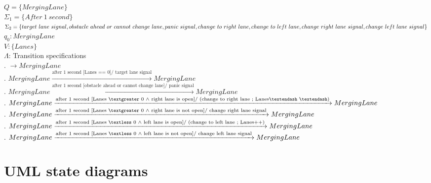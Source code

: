 \documentclass[12pt]{article}
\begin{document}
\begin{spacing}{1.5}
\noindent $Q = \{Merging Lane\}$\\
\noindent $\Sigma_1 = \{After~1~second\}$\\
\noindent $\Sigma_2 = \{target~lane~signal, obstacle~ahead~or~cannot~change~lane, panic~signal, change~to~right~lane,
\\\noindent change~to~left~lane, change~right~lane~signal, change~left~lane~signal\}$\\
\noindent $q_0: Merging Lane$\\
\noindent $V: \{Lanes\}$\\
\noindent $\Lambda$: Transition specifications\\
. $\rightarrow Merging Lane$\\
. $Merging Lane \xrightarrow {\text {after~1~second [Lanes == 0]/ target~lane~signal}} Merging Lane$\\
. $Merging Lane \xrightarrow {\text {after~1~second [obstacle~ahead~or~cannot~change~lane]/ panic~signal}} Merging Lane$\\
. $Merging Lane \xrightarrow {\text {after~1~second [Lanes $\textgreater$ 0 $\wedge$ right lane is open]/ (change~to~right~lane ; Lanes$\textendash~\textendash$)}} Merging Lane$\\
. $Merging Lane \xrightarrow {\text {after~1~second [Lanes $\textgreater$ 0 $\wedge$ right lane is not open]/ change~right~lane~signal}} Merging Lane$\\
. $Merging Lane \xrightarrow {\text {after~1~second [Lanes $\textless$ 0 $\wedge$ left lane is open]/ (change~to~left~lane ; Lanes++)}} Merging Lane$\\
. $Merging Lane \xrightarrow {\text {after~1~second [Lanes $\textless$ 0 $\wedge$ left lane is not open]/ change~left~lane~signal}} Merging Lane$\\

\newpage

\section{UML state diagrams}



\end{spacing}
\end{document}

